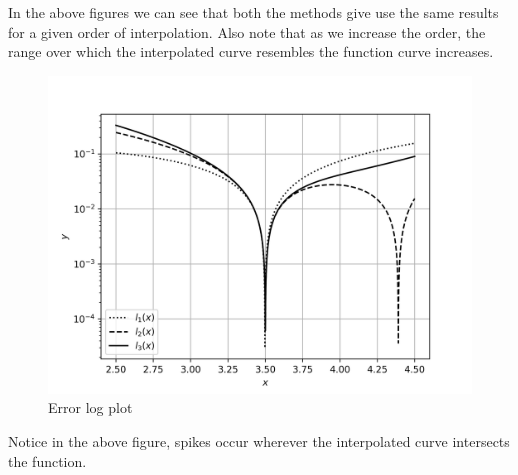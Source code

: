 \documentclass[12,a4paper]{article}
\begin{document}
    In the above figures we can see that both the methods give use the same results for a given order of interpolation. Also note that as we increase the order, the range over which the interpolated curve resembles the function curve increases.
    \begin{figure}[H]
        \centering
        \includegraphics[width=\textwidth]{plots/q4c.png}
        \caption{Error log plot}
        \label{fig:q4c}
    \end{figure}
    Notice in the above figure, spikes occur wherever the interpolated curve intersects the function.
    \newpage
\end{document}
